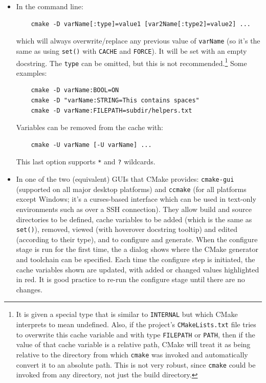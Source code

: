 \documentclass[table, xcdraw]{article}%
\begin{document}
\begin{itemize}
    \item In the command line:
    
    \begin{verbatim}
    cmake -D varName[:type]=value1 [var2Name[:type2]=value2] ...
    \end{verbatim}
    
    which will always overwrite/replace any previous value of \texttt{varName} (so it's the same as using \texttt{set()} with \texttt{CACHE} and \texttt{FORCE}). It will be set with an empty docstring. The \texttt{type} can be omitted, but this is not recommended.\footnote{It is given a special type that is similar to \texttt{INTERNAL} but which CMake interprets to mean undefined. Also, if the project’s \texttt{CMakeLists.txt} file tries to overwrite this cache variable and with type \texttt{FILEPATH} or \texttt{PATH}, then if the value of that cache variable is a relative path, CMake will treat it as being relative to the directory from which \texttt{cmake} was invoked and automatically convert it to an absolute path. This is not very robust, since \texttt{cmake} could be invoked from any directory, not just the build directory.} Some examples:
    
    \begin{verbatim}
    cmake -D varName:BOOL=ON
    cmake -D "varName:STRING=This contains spaces"
    cmake -D varName:FILEPATH=subdir/helpers.txt
    \end{verbatim}
    
    Variables can be removed from the cache with:
    
    \begin{verbatim}
    cmake -U varName [-U varName] ...
    \end{verbatim}
    
    This last option supports \texttt{*} and \texttt{?} wildcards.
    
    \item In one of the two (equivalent) GUIs that CMake provides: \texttt{cmake-gui} (supported on all major desktop platforms) and \texttt{ccmake} (for all platforms except Windows; it's a curses-based interface which can be used in text-only environments such as over a SSH connection). They allow build and source directories to be defined, cache variables to be added (which is the same as \texttt{set()}), removed, viewed (with hoverover docstring tooltip) and edited (according to their type), and to configure and generate. When the configure stage is run for the first time, the a dialog shows where the CMake generator and toolchain can be specified. Each time the configure step is initiated, the cache variables shown are updated, with added or changed values highlighted in red. It is good practice to re-run the configure stage until there are no changes.
    

\end{itemize}
\end{document}
